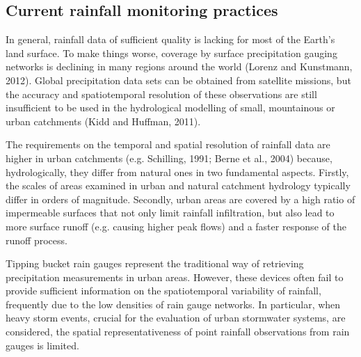 \documentclass{ctuthesis}\usepackage[]{graphicx}\usepackage[]{color}
\begin{document}
\subsection{Current rainfall monitoring practices}

In general, rainfall data of sufficient quality is lacking for most of the Earth’s land surface. To make things worse, coverage by surface precipitation gauging networks is declining in many regions around the world (Lorenz and Kunstmann, 2012). Global precipitation data sets can be obtained from satellite missions, but the accuracy and spatiotemporal resolution of these observations are still insufficient to be used in the hydrological modelling of small, mountainous or urban catchments (Kidd and Huffman, 2011).

The requirements on the temporal and spatial resolution of rainfall data are higher in urban catchments (e.g. Schilling, 1991; Berne et al., 2004) because, hydrologically, they differ from natural ones in two fundamental aspects. Firstly, the scales of areas examined in urban and natural catchment hydrology typically differ in orders of magnitude. Secondly, urban areas are covered by a high ratio of impermeable surfaces that not only limit rainfall infiltration, but also lead to more surface runoff (e.g. causing higher peak flows) and a faster response of the runoff process.

Tipping bucket rain gauges represent the traditional way of retrieving precipitation measurements in urban areas. However, these devices often fail to provide sufficient information on the spatiotemporal variability of rainfall, frequently due to the low densities of rain gauge networks. In particular, when heavy storm events, crucial for the evaluation of urban stormwater systems, are considered, the spatial representativeness of point rainfall observations from rain gauges is limited. 
\end{document}
